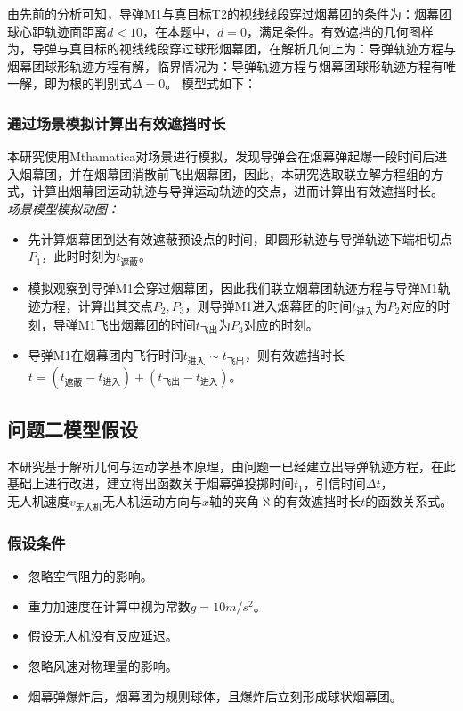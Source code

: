 \documentclass{article}
\begin{document}
由先前的分析可知，导弹M1与真目标T2的视线线段穿过烟幕团的条件为：烟幕团球心距轨迹面距离$d<10$，在本题中，$d = 0$，满足条件。有效遮挡的几何图样为，导弹与真目标的视线线段穿过球形烟幕团，在解析几何上为：导弹轨迹方程与烟幕团球形轨迹方程有解，临界情况为：导弹轨迹方程与烟幕团球形轨迹方程有唯一解，即为根的判别式$\Delta  = 0$。
模型式如下：
\subsubsection{通过场景模拟计算出有效遮挡时长}
本研究使用Mthamatica对场景进行模拟，发现导弹会在烟幕弹起爆一段时间后进入烟幕团，并在烟幕团消散前飞出烟幕团，因此，本研究选取联立解方程组的方式，计算出烟幕团运动轨迹与导弹运动轨迹的交点，进而计算出有效遮挡时长。
\textit{场景模型模拟动图：}

\begin{itemize}
    \item 先计算烟幕团到达有效遮蔽预设点的时间，即圆形轨迹与导弹轨迹下端相切点$P_1$，此时时刻为$t_\text{遮蔽}$。
    \item 模拟观察到导弹M1会穿过烟幕团，因此我们联立烟幕团轨迹方程与导弹M1轨迹方程，计算出其交点$P_2,P_3$，则导弹M1进入烟幕团的时间$t_{\text{进入}}$为$P_2$对应的时刻，导弹M1飞出烟幕团的时间$t_{\text{飞出}}$为$P_3$对应的时刻。
    \item 导弹M1在烟幕团内飞行时间$t_{\text{进入}} \sim t_{\text{飞出}}$，则有效遮挡时长$t =(t_\text{遮蔽}- t_\text{进入}) + (t_{\text{飞出}} - t_{\text{进入}})$。
\end{itemize}
\subsection{问题二模型假设}
本研究基于解析几何与运动学基本原理，由问题一已经建立出导弹轨迹方程，在此基础上进行改进，建立得出函数关于烟幕弹投掷时间$t_1$，引信时间$\Delta t$，$无人机速度 v_\text{无人机}$$无人机运动方向与x轴的夹角\aleph$的有效遮挡时长$t$的函数关系式。


\subsubsection{假设条件}
\begin{itemize}
    \item 忽略空气阻力的影响。
    \item 重力加速度在计算中视为常数$g = 10m/s^2$。
    \item 假设无人机没有反应延迟。
    \item 忽略风速对物理量的影响。
    \item 烟幕弹爆炸后，烟幕团为规则球体，且爆炸后立刻形成球状烟幕团。
\end{itemize}
\end{document}
